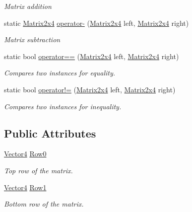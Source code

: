 \begin{DoxyCompactItemize}
\begin{DoxyCompactList}\small\item\em Matrix addition \end{DoxyCompactList}\item 
static \hyperlink{struct_open_t_k_1_1_matrix2x4}{Matrix2x4} \hyperlink{struct_open_t_k_1_1_matrix2x4_af1234d241834a229d7c1e719653719e7}{operator-\/} (\hyperlink{struct_open_t_k_1_1_matrix2x4}{Matrix2x4} left, \hyperlink{struct_open_t_k_1_1_matrix2x4}{Matrix2x4} right)
\begin{DoxyCompactList}\small\item\em Matrix subtraction \end{DoxyCompactList}\item 
static bool \hyperlink{struct_open_t_k_1_1_matrix2x4_a7dec98a7cb5af63358441cf4f11e3335}{operator==} (\hyperlink{struct_open_t_k_1_1_matrix2x4}{Matrix2x4} left, \hyperlink{struct_open_t_k_1_1_matrix2x4}{Matrix2x4} right)
\begin{DoxyCompactList}\small\item\em Compares two instances for equality. \end{DoxyCompactList}\item 
static bool \hyperlink{struct_open_t_k_1_1_matrix2x4_a0e30fe9d97b5f29d1dca0b1f7a6f9d0e}{operator!=} (\hyperlink{struct_open_t_k_1_1_matrix2x4}{Matrix2x4} left, \hyperlink{struct_open_t_k_1_1_matrix2x4}{Matrix2x4} right)
\begin{DoxyCompactList}\small\item\em Compares two instances for inequality. \end{DoxyCompactList}\end{DoxyCompactItemize}
\subsection*{Public Attributes}
\begin{DoxyCompactItemize}
\item 
\hyperlink{struct_open_t_k_1_1_vector4}{Vector4} \hyperlink{struct_open_t_k_1_1_matrix2x4_a6f9f177d5fa9e63724c46348b5045bb5}{Row0}
\begin{DoxyCompactList}\small\item\em Top row of the matrix. \end{DoxyCompactList}\item 
\hyperlink{struct_open_t_k_1_1_vector4}{Vector4} \hyperlink{struct_open_t_k_1_1_matrix2x4_a666e2381cfc56f373d3fe2d9093a8443}{Row1}
\begin{DoxyCompactList}\small\item\em Bottom row of the matrix. \end{DoxyCompactList}\end{DoxyCompactItemize}

